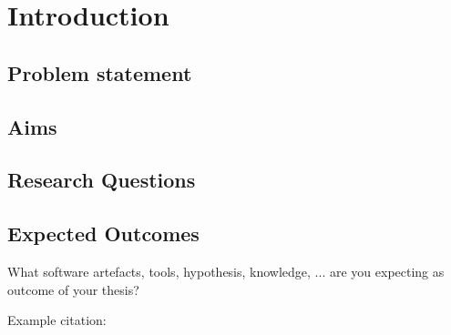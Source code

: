 \chapter{Introduction}
\label{chap:introduction}

\section{Problem statement} 

\section{Aims}

\section{Research Questions} 

\section{Expected Outcomes}
What software artefacts, tools, hypothesis, knowledge, ... are you expecting as outcome of your thesis?

Example citation: \cite{Turing1936}